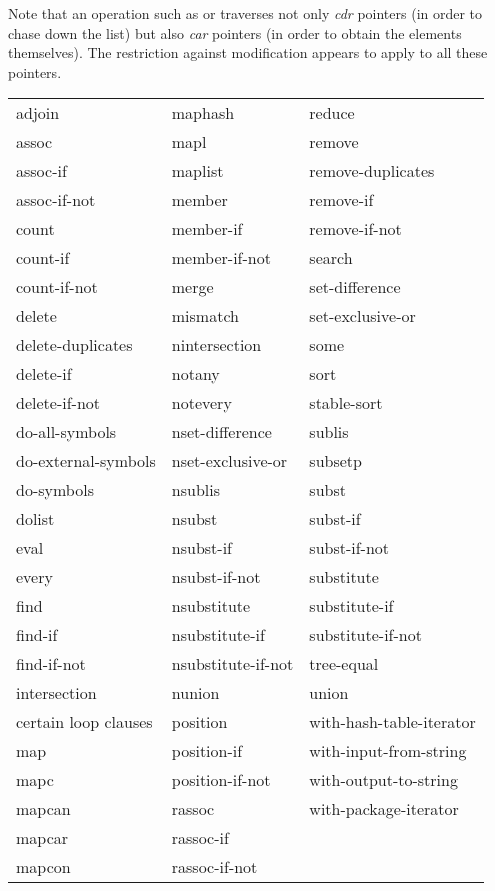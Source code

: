 Note that an operation such as  or  traverses
not only \emph{cdr} pointers (in order to chase down the list)
but also \emph{car} pointers (in order to obtain the elements themselves).
The restriction against modification appears to apply to all these pointers.

\begin{table}[t]
\leavevmode
{}

\begingroup\cf {}\relax
\begin{tabular*}{\textwidth}{@{}l@{\extracolsep{\fill}}ll@{}}
adjoin & maphash & reduce \\
assoc & mapl & remove \\
assoc-if & maplist & remove-duplicates \\
assoc-if-not & member & remove-if \\
count & member-if & remove-if-not \\
count-if & member-if-not & search \\
count-if-not & merge & set-difference \\
delete & mismatch & set-exclusive-or \\
delete-duplicates & nintersection & some \\
delete-if & notany & sort \\
delete-if-not & notevery & stable-sort \\
do-all-symbols & nset-difference & sublis \\
do-external-symbols & nset-exclusive-or & subsetp \\
do-symbols & nsublis & subst \\
dolist & nsubst & subst-if \\
eval & nsubst-if & subst-if-not \\
every & nsubst-if-not & substitute \\
find & nsubstitute & substitute-if \\
find-if & nsubstitute-if & substitute-if-not \\
find-if-not & nsubstitute-if-not & tree-equal \\
intersection & nunion & union \\
\textrm{certain} loop \textrm{clauses} & position & with-hash-table-iterator \\
map & position-if & with-input-from-string \\
mapc & position-if-not & with-output-to-string \\
mapcan & rassoc & with-package-iterator \\
mapcar & rassoc-if \\
mapcon & rassoc-if-not
\end{tabular*}
\endgroup
\end{table}

